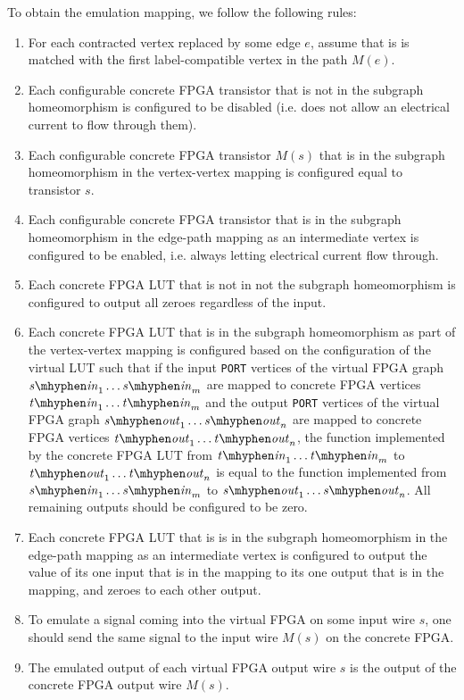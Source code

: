 To obtain the emulation mapping, we follow the following rules:
\begin{enumerate}
\item For each contracted vertex replaced by some edge $e$, assume that is is matched with the first label-compatible vertex in the path $M(e)$.
\item Each configurable concrete FPGA transistor that is not in the subgraph homeomorphism is configured to be disabled (i.e. does not allow an electrical current to flow through them).
\item Each configurable concrete FPGA transistor $M(s)$ that is in the subgraph homeomorphism in the vertex-vertex mapping is configured equal to transistor $s$.
\item Each configurable concrete FPGA transistor that is in the subgraph homeomorphism in the edge-path mapping as an intermediate vertex is configured to be enabled, i.e. always letting electrical current flow through.
\item Each concrete FPGA LUT that is not in not the subgraph homeomorphism is configured to output all zeroes regardless of the input.
\item Each concrete FPGA LUT that is in the subgraph homeomorphism as part of the vertex-vertex mapping is configured based on the configuration of the virtual LUT such that if the input \texttt{PORT} vertices of the virtual FPGA graph $\mathit{s\mhyphen in}_1 \dots \mathit{s\mhyphen in}_m$ are mapped to concrete FPGA vertices $\mathit{t\mhyphen in}_1 \dots \mathit{t\mhyphen in}_m$ and the output \texttt{PORT} vertices of the virtual FPGA graph $\mathit{s\mhyphen out}_1 \dots \mathit{s\mhyphen out}_n$ are mapped to concrete FPGA vertices $\mathit{t\mhyphen out}_1 \dots \mathit{t\mhyphen out}_n$, the function implemented by the concrete FPGA LUT from $\mathit{t\mhyphen in}_1 \dots \mathit{t\mhyphen in}_m$ to $\mathit{t\mhyphen out}_1 \dots \mathit{t\mhyphen out}_n$ is equal to the function implemented from $\mathit{s\mhyphen in}_1 \dots \mathit{s\mhyphen in}_m$ to $\mathit{s\mhyphen out}_1 \dots \mathit{s\mhyphen out}_n$. All remaining outputs should be configured to be zero.
\item Each concrete FPGA LUT that is is in the subgraph homeomorphism in the edge-path mapping as an intermediate vertex is configured to output the value of its one input that is in the mapping to its one output that is in the mapping, and zeroes to each other output.
\item To emulate a signal coming into the virtual FPGA on some input wire $s$, one should send the same signal to the input wire $M(s)$ on the concrete FPGA.
\item The emulated output of each virtual FPGA output wire $s$ is the output of the concrete FPGA output wire $M(s)$.
\end{enumerate}


